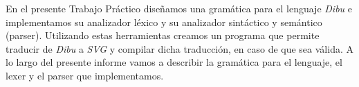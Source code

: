 En el presente Trabajo Práctico diseñamos una gramática para el lenguaje \textit{Dibu} e implementamos su analizador
léxico y su analizador sintáctico y semántico (parser). Utilizando estas herramientas creamos un programa que permite
traducir de \textit{Dibu} a \textit{SVG} y compilar dicha traducción, en caso de que sea válida. A lo largo del presente informe vamos a describir la gramática para el lenguaje, el lexer y el parser que implementamos.

